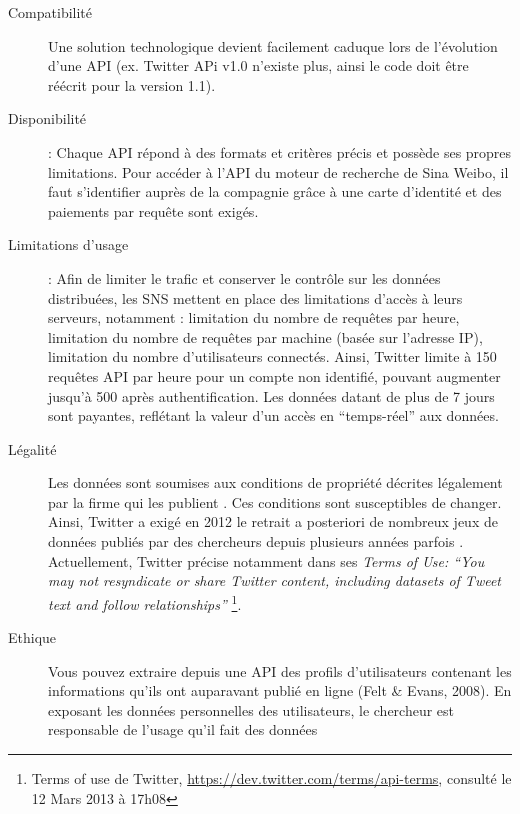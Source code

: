\begin{description}
    
    \item[Compatibilité] Une solution technologique devient facilement caduque lors de l{\textquoteright}évolution d{\textquoteright}une API (ex. Twitter APi v1.0 n{\textquoteright}existe plus, ainsi le code doit \^etre réécrit pour la version 1.1).  
    
    \item [Disponibilité] : Chaque API répond à des formats et critères précis et possède ses propres limitations. Pour accéder à l{\textquoteright}API du moteur de recherche de Sina Weibo, il faut s{\textquoteright}identifier auprès de la compagnie gr\^ace à une carte d{\textquoteright}identité et des paiements par requ\^ete sont exigés.

    \item[Limitations d{\textquoteright}usage] : Afin de limiter le trafic et conserver le contr\^ole sur les données distribuées, les SNS mettent en place des limitations d{\textquoteright}accès à leurs serveurs, notamment : limitation du nombre de requ\^etes par heure, limitation du nombre de requ\^etes par machine (basée sur l{\textquoteright}adresse IP), limitation du nombre d{\textquoteright}utilisateurs connectés. Ainsi, Twitter limite à 150 requ\^etes API par heure pour un compte non identifié, pouvant augmenter jusqu{\textquoteright}à 500 après authentification. Les données datant de plus de 7 jours sont payantes, reflétant la valeur d{\textquoteright}un accès en {\textquotedblleft}temps-réel{\textquotedblright} aux données.
    
    \item[Légalité ] Les données sont soumises aux conditions de propriété décrites légalement par la firme qui les publient \citep{Clifton2006}. Ces conditions sont susceptibles de changer. Ainsi, Twitter a exigé en 2012 le retrait a posteriori de nombreux jeux de données publiés par des chercheurs depuis plusieurs années parfois \citep{McCreadie2012}. Actuellement, Twitter précise notamment dans ses \textit{Terms of Use: {\textquotedblleft}You may not resyndicate or share Twitter content, including datasets of Tweet text and follow relationships{\textquotedblright} }\footnote{ Terms of use de Twitter, \url{https://dev.twitter.com/terms/api-terms}, consulté le 12 Mars 2013 à 17h08}.
    
    \item[Ethique] Vous pouvez extraire depuis une API des profils d{\textquoteright}utilisateurs contenant les informations qu{\textquoteright}ils ont auparavant publié en ligne (Felt \& Evans,  2008). En exposant les données personnelles des utilisateurs, le chercheur est responsable de l{\textquoteright}usage qu{\textquoteright}il fait des données \citep{Rieder2005}  
\end{description}


